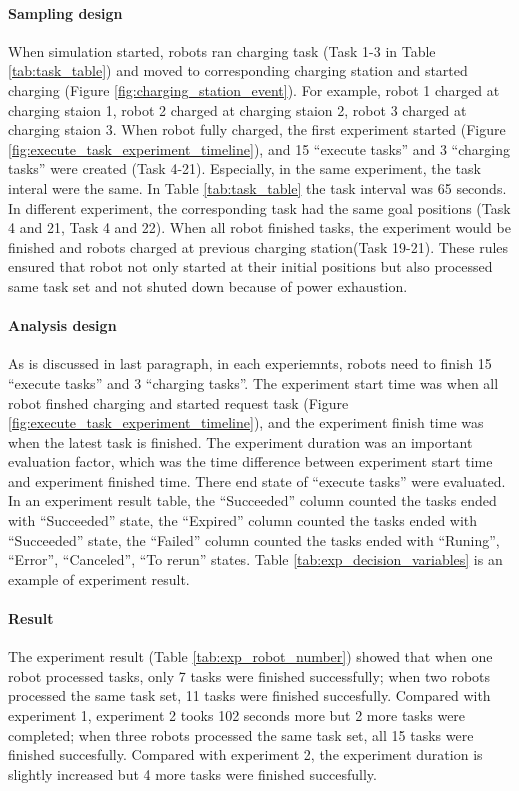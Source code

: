 \paragraph{Sampling design}
When simulation started, robots ran charging task (Task 1-3 in Table \ref{tab:task_table}) and moved to corresponding charging station and started charging (Figure \ref{fig:charging_station_event}). For example, robot 1 charged at charging staion 1, robot 2 charged at charging staion 2, robot 3 charged at charging staion 3. 
When robot fully charged, the first experiment started (Figure \ref{fig:execute_task_experiment_timeline}), and 15 ``execute tasks'' and 3 ``charging tasks'' were created (Task 4-21). Especially, in the same experiment, the task interal were the same. In Table \ref{tab:task_table} the task interval was 65 seconds. In different experiment, the corresponding task had the same goal positions (Task 4 and 21, Task 4 and 22). 
When all robot finished tasks, the experiment would be finished and robots charged at previous charging station(Task 19-21).
These rules ensured that robot not only started at their initial positions but also processed same task set and not shuted down because of power exhaustion.

\paragraph{Analysis design}
As is discussed in last paragraph, in each experiemnts, robots need to finish 15 ``execute tasks'' and 3 ``charging tasks''.
The experiment start time was when all robot finshed charging and started request task (Figure \ref{fig:execute_task_experiment_timeline}), and the experiment finish time was when the latest task is finished.
The experiment duration was an important evaluation factor, which was the time difference between experiment start time and experiment finished time.  
There end state of ``execute tasks'' were evaluated. In an experiment result table, the ``Succeeded'' column counted the tasks ended with ``Succeeded'' state, the ``Expired'' column counted the tasks ended with ``Succeeded'' state, the ``Failed'' column counted the tasks ended with ``Runing'', ``Error'', ``Canceled'', ``To rerun'' states. 
Table \ref{tab:exp_decision_variables} is an example of experiment result. 

\paragraph{Result} The experiment result (Table \ref{tab:exp_robot_number}) showed that when one robot processed tasks, only 7 tasks were finished successfully; when two robots processed the same task set, 11 tasks were finished succesfully. Compared with experiment 1, experiment 2 tooks 102 seconds more but 2 more tasks were completed; when three robots processed the same task set, all 15 tasks were finished succesfully. Compared with experiment 2, the experiment duration is slightly increased but 4 more tasks were finished succesfully.


